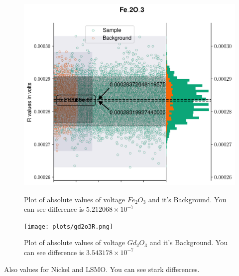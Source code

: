 \begin{figure}[hbt!]
  \includegraphics[width= \linewidth]{plots/fe2o3R.png}
  \label{Rdata1}
  \caption{Plot of absolute values of voltage $Fe_2O_3$ and it's Background. You can see difference is $5.212068 \times 10^{-7}$}
\end{figure}
\begin{figure}[hbt!]
  \texttt{[image: plots/gd2o3R.png]}
  \label{Rdata2}
  \caption{Plot of absolute values of voltage $Gd_2O_3$ and it's Background. You can see difference is $3.543178 \times 10^{-7}$}
\end{figure}

Also values for Nickel and LSMO. You can see stark differences.

